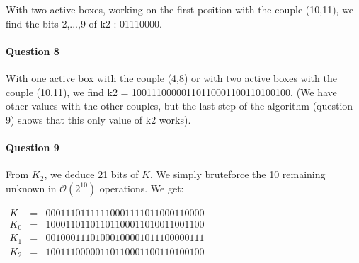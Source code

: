 \documentclass[a4paper]{article}
\begin{document}
With two active boxes, working on the first position with the couple (10,11), we find the bits 2,...,9 of k2 : 01110000.

\paragraph{Question 8}
With one active box with the couple (4,8) or with two active boxes with the couple
(10,11), we find k2 = 10011100000110110001100110100100.
(We have other values with the other couples, but the last step of the algorithm (question
9) shows that this only value of k2 works).

\paragraph{Question 9}

From $K_2$, we deduce 21 bits of $K$. We simply bruteforce the 10 remaining unknown in $\mathcal{O}(2^{10})$ operations. We get:

$
\begin{array}{rcl}
  K   & = & 00011101111110001111011000110000 \\
  K_0 & = & 10001101101101100011010011001100 \\
  K_1 & = & 00100011101000100001011100000111 \\
  K_2 & = & 10011100000110110001100110100100
\end{array}
$


 
\end{document}
